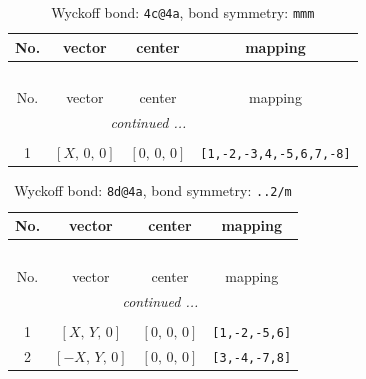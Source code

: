 \documentclass[fleqn,8pt]{jsarticle}
\begin{document}
\renewcommand{\arraystretch}{1.2}
\begin{longtable}{cccc}
\caption{Wyckoff bond: {\tt 4c@4a}, bond symmetry: {\tt mmm}}
 \\
 \hline \hline
No. & vector & center & mapping \\ \hline \endfirsthead

\multicolumn{3}{l}{\tablename\ \thetable{}} \\
 \hline \hline
No. & vector & center & mapping \\ \hline \endhead

 \hline \hline
\multicolumn{3}{r}{\footnotesize\it continued ...} \\ \endfoot

 \hline \hline
\multicolumn{3}{r}{} \\ \endlastfoot

1 & $\left[ X,\, 0,\, 0 \right]$ & $\left[ 0,\, 0,\, 0 \right]$ & {\tt [1,-2,-3,4,-5,6,7,-8]} \\
\end{longtable}
\renewcommand{\arraystretch}{1.2}
\begin{longtable}{cccc}
\caption{Wyckoff bond: {\tt 8d@4a}, bond symmetry: {\tt ..2/m}}
 \\
 \hline \hline
No. & vector & center & mapping \\ \hline \endfirsthead

\multicolumn{3}{l}{\tablename\ \thetable{}} \\
 \hline \hline
No. & vector & center & mapping \\ \hline \endhead

 \hline \hline
\multicolumn{3}{r}{\footnotesize\it continued ...} \\ \endfoot

 \hline \hline
\multicolumn{3}{r}{} \\ \endlastfoot

1 & $\left[ X,\, Y,\, 0 \right]$ & $\left[ 0,\, 0,\, 0 \right]$ & {\tt [1,-2,-5,6]} \\ \hline
2 & $\left[ - X,\, Y,\, 0 \right]$ & $\left[ 0,\, 0,\, 0 \right]$ & {\tt [3,-4,-7,8]} \\
\end{longtable}
\renewcommand{\arraystretch}{1.2}
\end{document}
